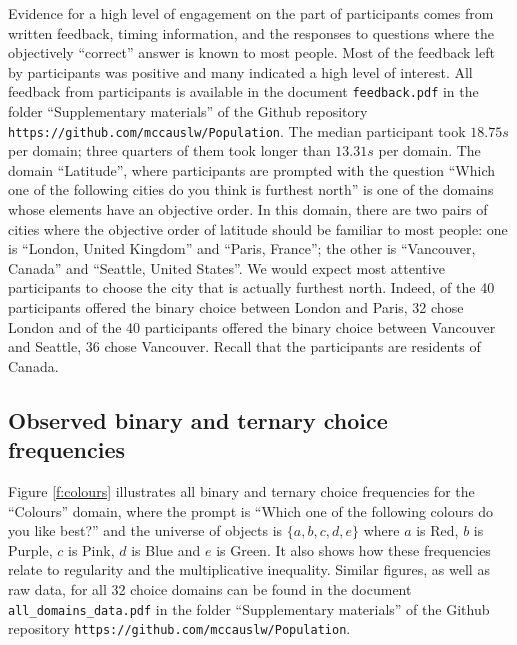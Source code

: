 \documentclass[11pt,letter]{article}
\begin{document}
Evidence for a high level of engagement on the part of participants comes from written feedback, timing information, and the responses to questions where the objectively ``correct'' answer is known to most people.
Most of the feedback left by participants was positive and many indicated a high level of interest.
All feedback from participants is available in the document \texttt{feedback.pdf} in the folder ``Supplementary materials'' of the Github repository \texttt{https://github.com/mccauslw/Population}.
The median participant took $18.75s$ per domain; three quarters of them took longer than $13.31s$ per domain.
The domain ``Latitude'', where participants are prompted with the question ``Which one of the following cities do you think is furthest north'' is one of the domains whose elements have an objective order.
In this domain, there are two pairs of cities where the objective order of latitude should be familiar to most people: one is ``London, United Kingdom'' and ``Paris, France''; the other is ``Vancouver, Canada'' and ``Seattle, United States''.
We would expect most attentive participants to choose the city that is actually furthest north.
Indeed, of the 40 participants offered the binary choice between London and Paris, 32 chose London and of the 40 participants offered the binary choice between Vancouver and Seattle, 36 chose Vancouver.
Recall that the participants are residents of Canada.

\subsection{Observed binary and ternary choice frequencies}

Figure \ref{f:colours} illustrates all binary and ternary choice frequencies for the ``Colours'' domain, where the prompt is ``Which one of the following colours do you like best?'' and the universe of objects is $\{a,b,c,d,e\}$ where $a$ is Red, $b$ is Purple, $c$ is Pink, $d$ is Blue and $e$ is Green.
It also shows how these frequencies relate to regularity and the multiplicative inequality.
Similar figures, as well as raw data, for all 32 choice domains can be found in the document \texttt{all\_domains\_data.pdf} in the folder ``Supplementary materials'' of the Github repository \texttt{https://github.com/mccauslw/Population}.
\end{document}
